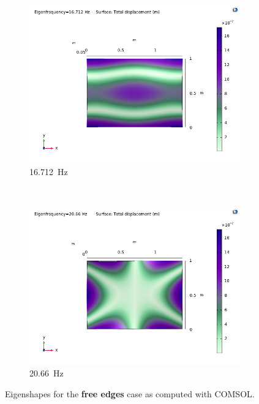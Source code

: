 \documentclass[a4paper]{article}
\begin{document}
\begin{figure}[h]
	\begin{subfigure}[b]{0.31\linewidth}
		\includegraphics[width=0.9\linewidth]{comsol/4f.png}
		\caption*{\SI{16.712}{\hertz}}
	\end{subfigure}
	~
	\begin{subfigure}[b]{0.31\linewidth}
		\includegraphics[width=0.9\linewidth]{comsol/5f.png}
		\caption*{\SI{20.66}{\hertz}}
	\end{subfigure}
	\caption{Eigenshapes for the \textbf{free edges} case as computed with COMSOL.}
	\label{fig:f_com}
\end{figure}
\end{document}

